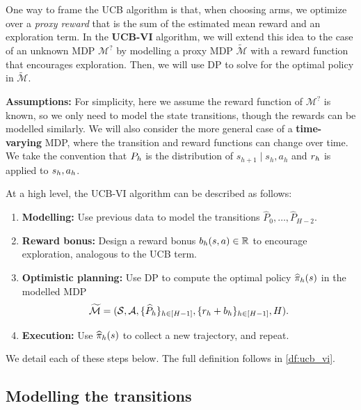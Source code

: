 \documentclass[\main/main]{subfiles}
\begin{document}
One way to frame the UCB algorithm is that, when choosing arms, we optimize over a \emph{proxy reward} that is the sum of the estimated mean reward and an exploration term.
In the \textbf{UCB-VI} algorithm, we will extend this idea to the case of an unknown MDP $\mathcal{M}^{?}$ by modelling a proxy MDP $\tilde{\mathcal{M}}$ with a reward function that encourages exploration. Then, we will use DP to solve for the optimal policy in $\tilde{\mathcal{M}}$.

\textbf{Assumptions:} For simplicity, here we assume the reward function of $\mathcal{M}^{?}$ is known, so we only need to model the state transitions, though the rewards can be modelled similarly. We will also consider the more general case of a \textbf{time-varying} MDP, where the transition and reward functions can change over time. We take the convention that $P_h$ is the distribution of $s_{h+1} \mid s_{h}, a_{h}$ and $r_h$ is applied to $s_h, a_h$.

At a high level, the UCB-VI algorithm can be described as follows:

\begin{enumerate}
    \item \textbf{Modelling:} Use previous data to model the transitions $\hat{P}_0, \dots, \hat{P}_{H-2}$.
    \item \textbf{Reward bonus:} Design a reward bonus $b_h(s, a) \in \mathbb{R}$ to encourage exploration, analogous to the UCB term.
    \item \textbf{Optimistic planning:} Use DP to compute the optimal policy $\widehat \pi_h(s)$ in the modelled MDP \[ \widetilde{\mathcal{M}} = (\mathcal{S}, \mathcal{A}, \{ \widehat{P}_h \}_{h \in [H-1]}, \{ r_h + b_h \}_{h \in [H-1]}, H). \]
    \item \textbf{Execution:} Use $\widehat \pi_h(s)$ to collect a new trajectory, and repeat.
\end{enumerate}

We detail each of these steps below. The full definition follows in \eqref{df:ucb_vi}.


\subsection{Modelling the transitions}

\end{document}
